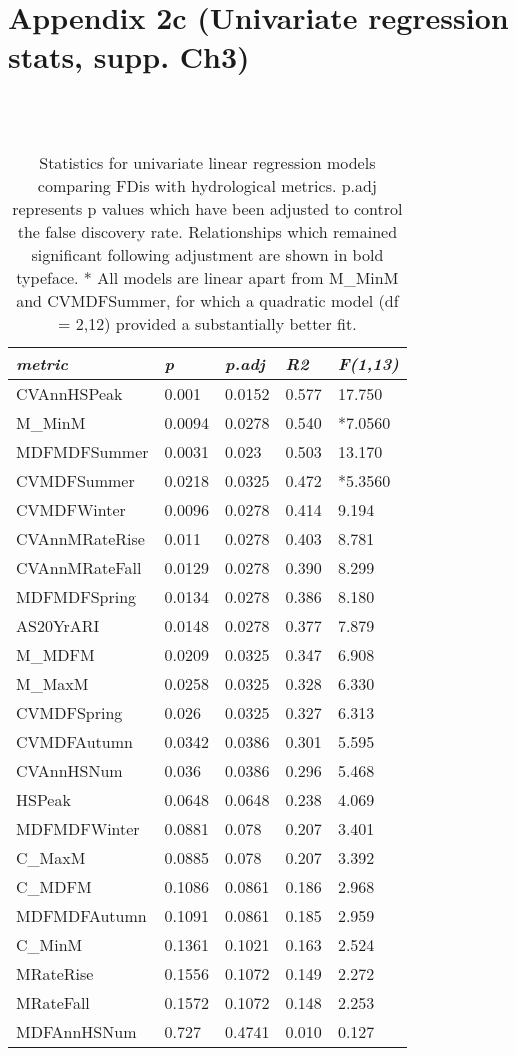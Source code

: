 \chapter[Appendix 2c (Univariate regression stats, supp. Ch3)]{Appendix 2c (Univariate regression stats, supp. Ch3)}

\begin{table}[ht]
\tiny
\centering
\caption[Statistics for univariate linear regression models.]{\small{Statistics for univariate linear regression models comparing FDis with hydrological metrics. p.adj represents p values which have been adjusted to control the false discovery rate. Relationships which remained significant following adjustment are shown in bold typeface. * All models are linear apart from M\_MinM and CVMDFSummer, for which a quadratic model (df = 2,12) provided a substantially better fit.}} \\
\label{Ch3sup4_T1} \\
{\tabulinesep=1.2mm
\begin{tabu} to 
\hline
\textit{metric} & \textit{p} & \textit{p.adj} & \textit{R2} & \textit{F(1,13)} \\
\hline
CVAnnHSPeak & 0.001 & 0.0152 & 0.577 & 17.750 \\
M\_MinM & 0.0094 & 0.0278 & 0.540 & *7.0560 \\
MDFMDFSummer & 0.0031 & 0.023 & 0.503 & 13.170 \\
CVMDFSummer & 0.0218 & 0.0325 & 0.472 & *5.3560 \\
CVMDFWinter & 0.0096 & 0.0278 & 0.414 & 9.194 \\
CVAnnMRateRise & 0.011 & 0.0278 & 0.403 & 8.781 \\
CVAnnMRateFall & 0.0129 & 0.0278 & 0.390 & 8.299 \\
MDFMDFSpring & 0.0134 & 0.0278 & 0.386 & 8.180 \\
AS20YrARI & 0.0148 & 0.0278 & 0.377 & 7.879 \\
M\_MDFM & 0.0209 & 0.0325 & 0.347 & 6.908 \\
M\_MaxM & 0.0258 & 0.0325 & 0.328 & 6.330 \\
CVMDFSpring & 0.026 & 0.0325 & 0.327 & 6.313 \\
CVMDFAutumn & 0.0342 & 0.0386 & 0.301 & 5.595 \\
CVAnnHSNum & 0.036 & 0.0386 & 0.296 & 5.468 \\
HSPeak & 0.0648 & 0.0648 & 0.238 & 4.069 \\
MDFMDFWinter & 0.0881 & 0.078 & 0.207 & 3.401 \\
C\_MaxM & 0.0885 & 0.078 & 0.207 & 3.392 \\
C\_MDFM & 0.1086 & 0.0861 & 0.186 & 2.968 \\
MDFMDFAutumn & 0.1091 & 0.0861 & 0.185 & 2.959 \\
C\_MinM & 0.1361 & 0.1021 & 0.163 & 2.524 \\
MRateRise & 0.1556 & 0.1072 & 0.149 & 2.272 \\
MRateFall & 0.1572 & 0.1072 & 0.148 & 2.253 \\
MDFAnnHSNum & 0.727 & 0.4741 & 0.010 & 0.127 \\
\hline
\end{tabu}}
\end{table}

\clearpage

